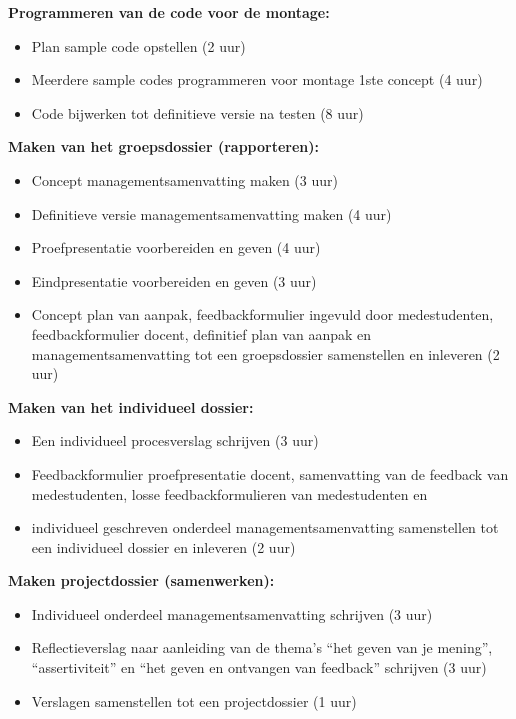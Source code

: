 \documentclass[oneside]{book}
\begin{document}
{\large \textbf{Programmeren van de code voor de montage:}}
\begin{itemize}
\item Plan sample code opstellen (2 uur)
\item Meerdere sample codes programmeren  voor montage 1ste concept (4 uur)
\item Code bijwerken tot definitieve versie na testen (8 uur)
\end{itemize}

\clearpage

{\large \textbf{Maken van het groepsdossier (rapporteren):}}
\begin{itemize}
\item Concept managementsamenvatting maken (3 uur)
\item Definitieve versie managementsamenvatting maken (4 uur)
\item Proefpresentatie voorbereiden en geven (4 uur)
\item Eindpresentatie voorbereiden en geven (3 uur)
\item Concept plan van aanpak, feedbackformulier ingevuld door medestudenten, feedbackformulier docent, definitief plan van aanpak en managementsamenvatting tot een groepsdossier samenstellen en inleveren (2 uur)
\end{itemize}

{\large \textbf{Maken van het individueel dossier:}}
\begin{itemize}
\item Een individueel procesverslag schrijven (3 uur)
\item Feedbackformulier proefpresentatie docent, samenvatting van de feedback van medestudenten, losse feedbackformulieren van medestudenten en \item individueel geschreven onderdeel managementsamenvatting samenstellen tot een individueel dossier en inleveren (2 uur)
\end{itemize}

{\large \textbf{Maken projectdossier (samenwerken):}}
\begin{itemize}
\item Individueel onderdeel managementsamenvatting schrijven (3 uur)
\item Reflectieverslag naar aanleiding van de thema’s “het geven van je mening”, “assertiviteit” en “het geven en ontvangen van feedback” schrijven (3 uur)
\item Verslagen samenstellen tot een projectdossier (1 uur)
\end{itemize}
\end{document}
